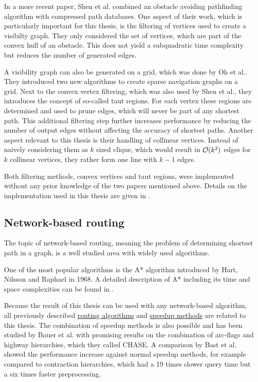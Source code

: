 		In a more recent paper, Shen et al. combined an obstacle avoiding pathfinding algorithm with compressed path databases\cite{shen-euclidean-routing-cpd}.
		One aspect of their work, which is particularly important for this thesis, is the filtering of vertices used to create a visibilty graph.
		They only considered the set of vertices, which are part of the convex hull of an obstacle.
		This does not yield a subquadratic time complexity but reduces the number of generated edges.
		
		A visibility graph can also be generated on a grid, which was done by Oh et al.\cite{oh-grid-vgraph}.
		They introduced two new algorithms to create sparse navigation graphs on a grid.
		Next to the convex vertex filtering, which was also used by Shen et al., they introduces the concept of so-called taut regions.
		For each vertex these regions are determined and used to prune edges, which will never be part of any shortest path.
		This additional filtering step further increases performance by reducing the number of output edges without affecting the accuracy of shortest paths.
		Another aspect relevant to this thesis is their handling of collinear vertices.
		Instead of naively considering them as $k$ sized clique, which would result in $\mathcal{O}(k^2)$ edges for $k$ collinear vertices, they rather form one line with $k-1$ edges.
		
		Both filtering methods, convex vertices and taut regions, were implemented without any prior knowledge of the two papers mentioned above.
		Details on the implementation used in this thesis are given in .
		
	\subsection{Network-based routing}
	
		The topic of network-based routing, meaning the problem of determining shortest path in a graph, is a well studied area with widely used algorithms.
		
		One of the most popular algorithms is the A* algorithm introduced by Hart, Nilsson and Raphael in 1968\cite{astar}.
		A detailed description of A* including its time and space complexities can be found in .

		Because the result of this thesis can be used with any network-based algorithm, all previously described \hyperref[subsec:routing-engines]{routing algorithms} and \hyperref[subsec:speedup-methods]{speedup methods} are related to this thesis.
		The combination of speedup methods is also possible and has been studied by Bauer et al.\cite{bauer-combining-speedup-methods} with promising results on the combination of arc-flags and highway hierarchies, which they called CHASE.
		A comparison by Bast et al. showed the performance increase against normal speedup methods\cite{bast-transportation-networks}, for example compared to contraction hierarchies, which had a 19 times slower query time but a six times faster preprocessing.

